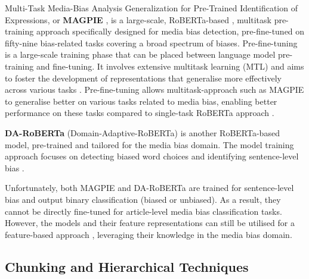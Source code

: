 Multi-Task Media-Bias Analysis Generalization for Pre-Trained Identification of Expressions, or \textbf{MAGPIE} \cite{horych-2024-magpie}, is a large-scale, RoBERTa-based \cite{liu-2019-roberta}, multitask pre-training approach specifically designed for media bias detection, pre-fine-tuned on fifty-nine bias-related tasks covering a broad spectrum of biases. Pre-fine-tuning \cite{aghajanyan-2021-muppet} is a large-scale training phase that can be placed between language model pre-training and fine-tuning. It involves extensive multitask learning (MTL) \cite{caruana-1997-mtl} and aims to foster the development of representations that generalise more effectively across various tasks \cite{aghajanyan-2021-muppet}. Pre-fine-tuning allows multitask-approach such as MAGPIE to generalise better on various tasks related to media bias, enabling better performance on these tasks compared to single-task RoBERTa approach \cite{horych-2024-magpie}.

\textbf{DA-RoBERTa} (Domain-Adaptive-RoBERTa) \cite{krieger-2022-domain} is another RoBERTa-based model, pre-trained and tailored for the media bias domain. The model training approach focuses on detecting biased word choices and identifying sentence-level bias \cite{krieger-2022-domain}.

Unfortunately, both MAGPIE and DA-RoBERTa are trained for sentence-level bias and output binary classification (biased or unbiased). As a result, they cannot be directly fine-tuned for article-level media bias classification tasks. However, the models and their feature representations can still be utilised for a feature-based approach \cite{devlin-2019-bert}, leveraging their knowledge in the media bias domain.


\subsection{Chunking and Hierarchical Techniques}

